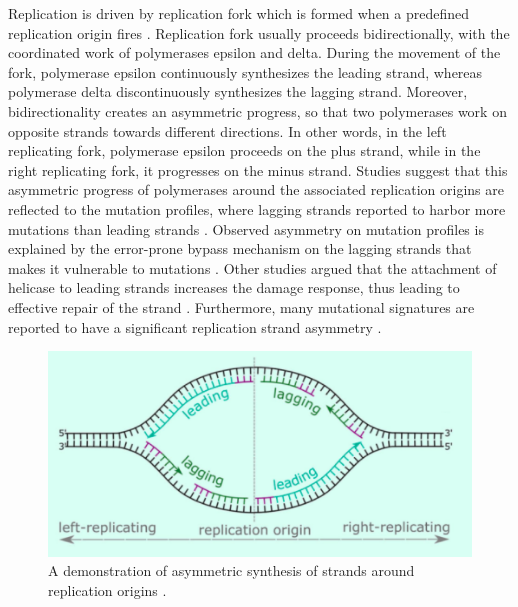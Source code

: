 Replication is driven by replication fork which is formed when a predefined replication origin fires \citep{langston2009whither}. Replication fork usually proceeds bidirectionally, with the coordinated work of polymerases \gls{epsilon} and \gls{delta}. During the movement of the fork, polymerase \gls{epsilon} continuously synthesizes the leading strand, whereas polymerase \gls{delta} discontinuously synthesizes the lagging strand. Moreover, bidirectionality creates an asymmetric progress, so that two polymerases work on opposite strands towards different directions. In other words, in the left replicating fork, polymerase \gls{epsilon} proceeds on the plus strand, while in the right replicating fork, it progresses on the minus strand. Studies suggest that this asymmetric progress of polymerases around the associated replication origins are reflected to the mutation profiles, where lagging strands reported to harbor more mutations than leading strands \citep{haradhvala2016mutational,lujan2012mismatch,reijns2015lagging,shinbrot2014exonuclease}. Observed asymmetry on mutation profiles is explained by the error-prone bypass mechanism on the lagging strands that makes it vulnerable to mutations \citep{seplyarskiy2019error}. Other studies argued that the attachment of helicase to leading strands increases the damage response, thus leading to effective repair of the strand \citep{hedglin2017eukaryotic,yeeles2013rescuing}. Furthermore, many mutational signatures are reported to have a significant replication strand asymmetry \citep{tomkova2018mutational}.

\begin{figure}[H]
    \begin{center}
    \includegraphics[width=\textwidth]{Chapters/1_introduction/figures/repfork}
    \caption{A demonstration of asymmetric synthesis of strands around replication origins \citep{tomkova2018mutational}.}
    \label{fig:introrepfork}
    \end{center}
    \end{figure}

